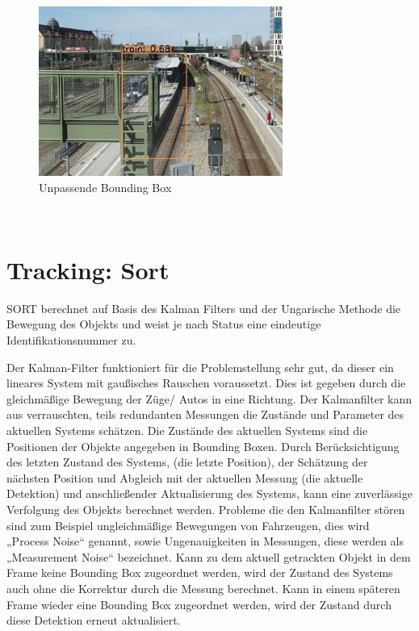 \documentclass[conference]{IEEEtran}
\begin{document}
	\begin{figure}[!h]
		\begin{center}
			\includegraphics[width=8cm]{Media/Output_564.jpg}
			\caption{Unpassende Bounding Box}
			\label{UB3}
		\end{center}
	\end{figure}\\

	
	
	\section{Tracking: Sort}
	SORT \cite{sort} berechnet auf Basis des Kalman Filters \cite{kalman} und der Ungarische Methode \cite{hungarian} die Bewegung des Objekts und weist je nach Status eine eindeutige Identifikationsnummer zu. 
	
	Der Kalman-Filter funktioniert für die Problemstellung sehr gut, da dieser ein lineares System mit gaußisches Rauschen voraussetzt. Dies ist gegeben durch die gleichmäßige Bewegung der Züge/ Autos in eine Richtung.
	Der Kalmanfilter kann aus verrauschten, teils redundanten Messungen die Zustände und Parameter des aktuellen Systems schätzen. 
	Die Zustände des aktuellen Systems sind die Positionen der Objekte angegeben in Bounding Boxen. Durch Berücksichtigung des letzten Zustand des Systems, (die letzte Position), der Schätzung der nächsten Position und Abgleich mit der aktuellen Messung (die aktuelle Detektion) und anschließender Aktualisierung des Systems, kann eine zuverlässige Verfolgung des Objekts berechnet werden. Probleme die den Kalmanfilter stören sind zum Beispiel ungleichmäßige Bewegungen von Fahrzeugen, dies wird „Process Noise“ genannt, sowie Ungenauigkeiten in Messungen, diese werden als „Measurement Noise“ bezeichnet.
	Kann zu dem aktuell getrackten Objekt in dem Frame keine Bounding Box zugeordnet werden, wird der Zustand des Systems auch ohne die Korrektur durch die Messung berechnet. Kann in einem späteren Frame wieder eine Bounding Box zugeordnet werden, wird der Zustand durch diese Detektion erneut aktualisiert.
	
\end{document}
